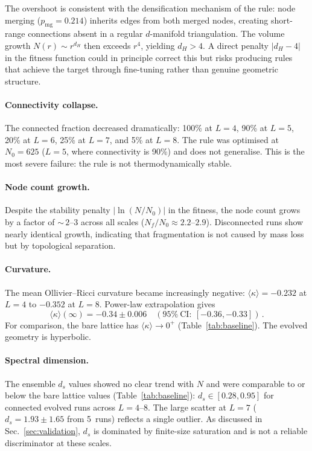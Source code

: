 \documentclass[aps,prd,twocolumn,superscriptaddress,floatfix]{revtex4-2}
\begin{document}
The overshoot is consistent with the densification mechanism
of the rule: node merging ($p_{\mathrm{mg}} = 0.214$) inherits
edges from both merged nodes, creating short-range connections
absent in a regular $d$-manifold triangulation.
The volume growth $N(r) \sim r^{d_H}$ then exceeds $r^4$, yielding
$d_H > 4$.  A direct penalty $|d_H - 4|$ in the fitness
function could in principle correct this but risks producing
rules that achieve the target through fine-tuning rather than
genuine geometric structure.

\paragraph{Connectivity collapse.}
The connected fraction decreased dramatically:
100\% at $L\!=\!4$, 90\% at $L\!=\!5$, 20\% at $L\!=\!6$,
25\% at $L\!=\!7$, and 5\% at $L\!=\!8$.
The rule was optimised at $N_0 = 625$ ($L\!=\!5$, where
connectivity is 90\%) and does not generalise.
This is the most severe failure: the rule is not
thermodynamically stable.

\paragraph{Node count growth.}
Despite the stability penalty $|\ln(N/N_0)|$ in the fitness,
the node count grows by a factor of ${\sim}\,2$--$3$ across all
scales ($N_f / N_0 \approx 2.2$--$2.9$).  Disconnected runs
show nearly identical growth, indicating that fragmentation
is not caused by mass loss but by topological separation.

\paragraph{Curvature.}
The mean Ollivier--Ricci curvature became increasingly negative:
$\langle\kappa\rangle = -0.232$ at $L\!=\!4$ to $-0.352$ at
$L\!=\!8$.  Power-law extrapolation gives
\begin{equation}
  \langle\kappa\rangle(\infty) = -0.34 \pm 0.006
  \quad (95\%\ \mathrm{CI:}\ [-0.36, -0.33]) \,.
\end{equation}
For comparison, the bare lattice has
$\langle\kappa\rangle \to 0^+$ (Table~\ref{tab:baseline}).
The evolved geometry is hyperbolic.

\paragraph{Spectral dimension.}
The ensemble $d_s$ values showed no clear trend with $N$ and were
comparable to or below the bare lattice values
(Table~\ref{tab:baseline}): $d_s \in [0.28, 0.95]$ for connected
evolved runs across $L = 4$--$8$.  The large scatter at $L\!=\!7$
($d_s = 1.93 \pm 1.65$ from 5~runs) reflects a single outlier.
As discussed in Sec.~\ref{sec:validation}, $d_s$ is dominated by
finite-size saturation and is not a reliable discriminator at
these scales.
\end{document}
